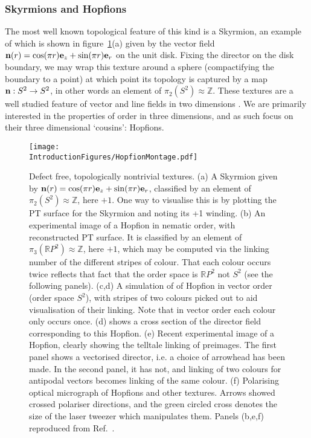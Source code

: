 \subsubsection{Skyrmions and Hopfions}
\label{subsec:SkyrmionsAndHopfions}
The most well known topological feature of this kind is a Skyrmion, an example of which is shown in figure~\ref{fig:HopfionMontage}(a) given by the vector field ${\bf n}(r) = \cos(\pi r) {\bf e}_z + \sin(\pi r) {\bf e}_r$ on the unit disk. Fixing the director on the disk boundary, we may wrap this texture around a sphere (compactifying the boundary to a point) at which point its topology is captured by a map ${\bf n} : S^2 \rightarrow S^2$, in other words an element of $\pi_2 (S^2)\approx \mathbb{Z}$. These textures are a well studied feature of vector and line fields in two dimensions \citep{AlexanderBook}. We are primarily interested in the properties of order in three dimensions, and as such focus on their three dimensional `cousins': Hopfions.
\begin{figure}[htbp]
\centering
\texttt{[image: \\IntroductionFigures/HopfionMontage.pdf]}
\caption{Defect free, topologically nontrivial textures. (a) A Skyrmion given by ${\bf n}(r) = \cos(\pi r) {\bf e}_z + \sin(\pi r) {\bf e}_r$, classified by an element of $\pi_2(S^2)\approx \mathbb{Z}$, here $+1$. One way to visualise this is by plotting the PT surface for the Skyrmion and noting its +1 winding. (b) An experimental image of a Hopfion in nematic order, with reconstructed PT surface. It is classified by an element of $\pi_3(\mathbb{R}P^2)\approx \mathbb{Z}$, here $+1$, which may be computed via the linking number of the different stripes of colour. That each colour occurs twice reflects that fact that the order space is $\mathbb{R}P^2$ not $S^2$ (see the following panels). (c,d) A simulation of of Hopfion in vector order (order space $S^2$), with stripes of two colours picked out to aid visualisation of their linking. Note that in vector order each colour only occurs once. (d) shows a cross section of the director field corresponding to this Hopfion. (e) Recent experimental image of a Hopfion, clearly showing the telltale linking of preimages. The first panel shows a vectorised director, i.e. a choice of arrowhead has been made. In the second panel, it has not, and linking of two colours for antipodal vectors becomes linking of the same colour. (f) Polarising optical micrograph of Hopfions and other textures. Arrows showed crossed polariser directions, and the green circled cross denotes the size of the laser tweezer which manipulates them. Panels (b,e,f) reproduced from Ref.~\citep{Chen2013,Ackerman2017}.}
\label{fig:HopfionMontage}
\end{figure}
